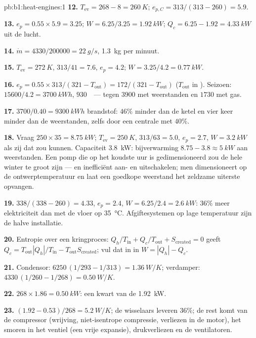 \begin{solution}{pb:b1:heat-engines:1}
\textbf{12.} $T_{\mathrm{ev}} = 268 - 8 = \qty{260}{K}$; $e_{p,C} = 313/(313 - 260)
= 5.9$.

\textbf{13.} $e_p = 0.55 \times 5.9 = 3.25$; $W = 6.25/3.25 = \qty{1.92}{kW}$;
$Q_c = 6.25 - 1.92 = \qty{4.33}{kW}$ uit de lucht.

\textbf{14.} $\dot m = 4330/200000 = \qty{22}{g/s}$, \qty{1.3}{kg} per minuut.

\textbf{15.} $T_{\mathrm{ev}} = \qty{272}{K}$, $313/41 = 7.6$, $e_p = 4.2$;
$W = 3.25/4.2 = \qty{0.77}{kW}$.

\textbf{16.} $e_p = 0.55 \times 313/(321 - T_{\mathrm{out}}) = 172/(321 -
T_{\mathrm{out}})$ ($T_{\mathrm{out}}$ in ). Seizoen: $15600/4.2 =
\qty{3700}{kW h}$, $930$~\texteuro\ --- tegen $3900$ met weerstanden en
$1730$ met gas.

\textbf{17.} $3700/0.40 = \qty{9300}{kW h}$ brandstof: $46\%$ minder dan de
ketel en vier keer minder dan de weerstanden, zelfs door een centrale met
 $40\%$.

\textbf{18.} Vraag $250 \times 35 = \qty{8.75}{kW}$; $T_{\mathrm{ev}} = \qty{250}{K}$,
$313/63 = 5.0$, $e_p = 2.7$, $W = \qty{3.2}{kW}$ als zij dat zou kunnen. Capaciteit
\qty{3.8}{kW}: bijverwarming $8.75 - 3.8 \approx \qty{5}{kW}$ aan weerstanden. Een pomp
die op het koudste uur is gedimensioneerd zou de hele winter te groot zijn ---
en inefficiënt aan- en uitschakelen; men dimensioneert op de ontwerptemperatuur en
laat een goedkope weerstand het zeldzame uiterste opvangen.

\textbf{19.} $338/(338 - 260) = 4.33$, $e_p = 2.4$, $W = 6.25/2.4 =
\qty{2.6}{kW}$: $36\%$ meer elektriciteit dan met de vloer op
\qty{35}{\degreeCelsius}. Afgiftesystemen op lage temperatuur zijn de halve
installatie.

\textbf{20.} Entropie over een kringproces: $Q_h/T_{\mathrm{in}} + Q_c/T_{\mathrm{out}} +
S_{\mathrm{created}} = 0$ geeft $Q_c = T_{\mathrm{out}}|Q_h|/T_{\mathrm{in}} -
T_{\mathrm{out}}S_{\mathrm{created}}$; vul dat in in $W = |Q_h| - Q_c$.

\textbf{21.} Condensor: $6250\,(1/293 - 1/313) = \qty{1.36}{W/K}$; verdamper:
$4330\,(1/260 - 1/268) = \qty{0.50}{W/K}$.

\textbf{22.} $268 \times 1.86 = \qty{0.50}{kW}$: een kwart van de
\qty{1.92}{kW}.

\textbf{23.} $(1.92 - 0.53)/268 = \qty{5.2}{W/K}$; de wisselaars leveren
$36\%$; de rest komt van de compressor (wrijving, niet-isentrope
compressie, verliezen in de motor), het smoren in het ventiel (een vrije
expansie), drukverliezen en de ventilatoren.


\end{solution}

